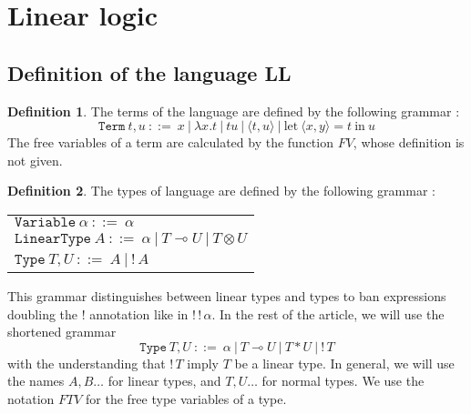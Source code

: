 \documentclass[10pt]{article}
\theoremstyle{plain}
\theoremstyle{definition}
\newtheorem{defn}{Definition}[subsection] %
\def\bang{!\,}
\newcommand{\pair}[2]{\langle #1, #2 \rangle}
\begin{document}
\maketitle

\newpage

\section{Linear logic}

\subsection{Definition of the language LL}

\begin{defn} The terms of the language are defined by the following grammar :
	$$\texttt{Term} ~ t, u ~ ::= ~ x ~ | ~ \lambda x.t ~ | ~ t u ~|~ \pair{t}{u} ~|~ \text{let} ~ \pair{x}{y} = t ~ \text{in} ~ u  $$
	The free variables of a term are calculated by the function $FV$, whose definition is not given.
\end{defn}

\begin{defn} The types of language are defined by the following grammar :
	\begin{center}
	\begin{tabular}{l}
		$\texttt{Variable} ~ \alpha ~ ::= ~ \alpha$ \\
		$\texttt{LinearType} ~ A ~ ::= ~ \alpha ~|~ T \multimap U ~|~ T \otimes U$\\
		$\texttt{Type} ~ T, U       ~ ::= ~ A ~|~ \bang A$
	\end{tabular}
	\end{center}
	This grammar distinguishes between linear types and types to ban expressions doubling the $!$ annotation
	like in $\bang \bang \alpha$. In the rest of the article, we will use the shortened grammar
		$$\texttt{Type} ~ T, U ~ ::= ~ \alpha ~|~ T \multimap U ~|~ T * U ~|~ \bang T$$
	with the understanding that $\bang T$ imply $T$ be a linear type. In general, we will use the names
	$A, B \dots$ for linear types, and $T, U \dots$ for normal types.
	We use the notation $FTV$ for the free type variables of a type.
\end{defn}
\end{document}
